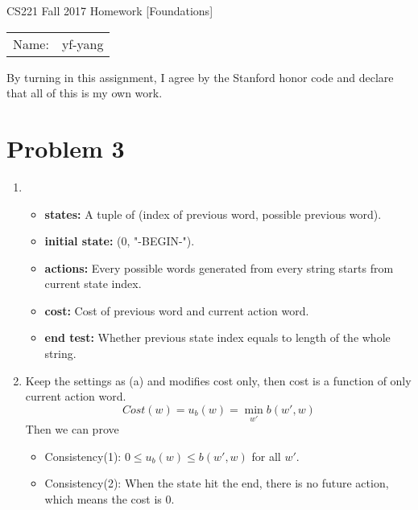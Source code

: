 \documentclass[12pt]{article}
\begin{document}
\begin{center}
{\Large CS221 Fall 2017 Homework [Foundations]}

\begin{tabular}{rl}
Name: & yf-yang
\end{tabular}
\end{center}

By turning in this assignment, I agree by the Stanford honor code and declare
that all of this is my own work.

\section*{Problem 3}

\begin{enumerate}[label=(\alph*)]
    \item \ 
    \begin{itemize}
        \item \textbf{states:} A tuple of (index of previous word, possible previous word).
        \item \textbf{initial state:} (0, "-BEGIN-").
        \item \textbf{actions:} Every possible words generated from every string starts from current state index.
        \item \textbf{cost:} Cost of previous word and current action word.
        \item \textbf{end test:} Whether previous state index equals to length of the whole string.
    \end{itemize}
    
    \setcounter{enumi}{2}
    \item
        Keep the settings as (a) and modifies cost only, then cost is a function of only current action word. \\
        \begin{equation}
            Cost(w) = u_b(w) = \min_{w'}{b(w',w)}
        \end{equation}
        Then we can prove
        \begin{itemize}
            \item Consistency(1): $0 \le u_b(w) \le b(w', w)$ for all $w'$.
            \item Consistency(2): When the state hit the end, there is no future action, which means the cost is 0.
        \end{itemize}
\end{enumerate}
\end{document}
